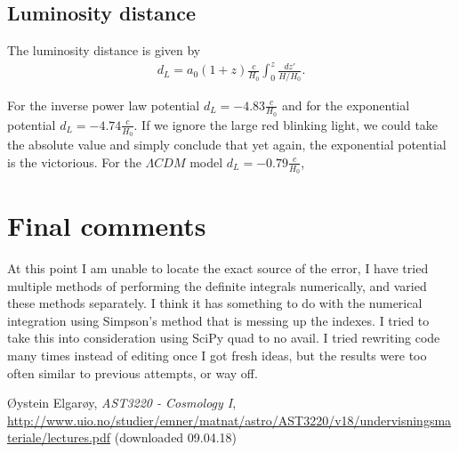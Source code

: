 \documentclass[a4paper,10pt]{article}
\begin{document}
\subsection{Luminosity distance}
The luminosity distance is given by
\begin{align}
d_L = a_0(1+z)\frac{c}{H_0}\int_0^z \frac{dz'}{H/H_0}.
\end{align}

For the inverse power law potential $d_L = -4.83\frac{c}{H_0}$ and for the exponential potential $d_L = -4.74\frac{c}{H_0}$. If we ignore the large red blinking light, we could take the absolute value and simply conclude that yet again, the exponential potential is the victorious. For the $\Lambda CDM$ model $d_L = -0.79\frac{c}{H_0}$,

\section*{Final comments}
At this point I am unable to locate the exact source of the error, I have tried multiple methods of performing the definite integrals numerically, and varied these methods separately. I think it has something to do with the numerical integration using Simpson's method that is messing up the indexes. I tried to take this into consideration using SciPy quad to no avail. I tried rewriting code many times instead of editing once I got fresh ideas, but the results were too often similar to previous attempts, or way off. 



\begin{thebibliography}{9}

  Øystein Elgarøy,
  \textit{AST3220 - Cosmology I},
  \url{http://www.uio.no/studier/emner/matnat/astro/AST3220/v18/undervisningsmateriale/lectures.pdf} (downloaded 09.04.18)

\end{thebibliography}
\end{document}
